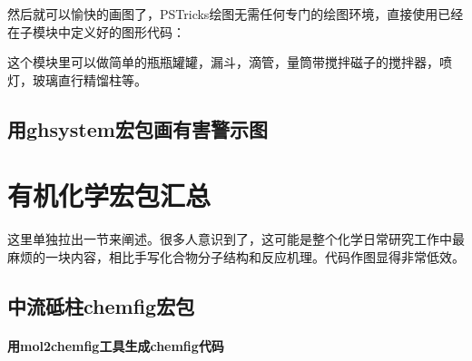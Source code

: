 \documentclass[a4paper,UTF8,zihao = -4]{ctexart} %
\begin{document}
然后就可以愉快的画图了，PSTricks绘图无需任何专门的绘图环境，直接使用已经在子模块中定义好的图形代码：


这个模块里可以做简单的瓶瓶罐罐，漏斗，滴管，量筒带搅拌磁子的搅拌器，喷灯，玻璃直行精馏柱等。


\subsection{用\textsf{ghsystem}宏包画有害警示图}



\section{有机化学宏包汇总}
\label{sec:organic}

这里单独拉出一节来阐述。很多人意识到了，这可能是整个化学日常研究工作中最麻烦的一块内容，相比手写化合物分子结构和反应机理。代码作图显得非常低效。

\subsection{中流砥柱\textsf{chemfig}宏包}
\label{sec:chemfig}



\paragraph{用\textsf{mol2chemfig}工具生成\textsf{chemfig}代码}
\end{document}
